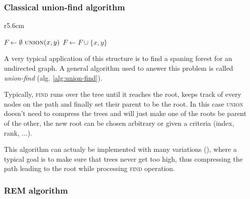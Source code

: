 \documentclass[12px]{article}
\begin{document}
      \subsubsection{Classical union-find algorithm}
        \setlength\intextsep{0pt}
        \begin{wrapfigure}{r}{5.6cm}
          \centering
          \begin{minipage}{\linewidth}
            \begin{algorithm}[H]
              \caption{General structure of Union-Find}
              \label{alg:union-find}
              \begin{algorithmic}[1]
                \State $F \gets \emptyset$
                  \State {}
                \EndFor
                    \State $\Call{union}{x, y}$
                    \State $F \gets F \cup \{x, y\}$
                  \EndIf
                \EndFor
              \end{algorithmic}
            \end{algorithm}
          \end{minipage}
        \end{wrapfigure}

        A very typical application of this structure is to find a spaning forest for an undirected graph. A general algorithm used to answer this problem is called \emph{union-find} (alg. \ref{alg:union-find}).

        Typically, \textsc{find} runs over the tree until it reaches the root, keeps track of every nodes on the path and finally set their parent to be the root. In this case \textsc{union} doesn't need to compress the trees and will just make one of the roots be parent of the other, the new root can be chosen arbitrary or given a criteria (index, rank, ...).

        This algorithm can actualy be implemented with many variations (), where a typical goal is to make sure that trees never get too high, thus compressing the path leading to the root while processing \textsc{find} operation.


      \subsubsection{REM algorithm}
\end{document}
